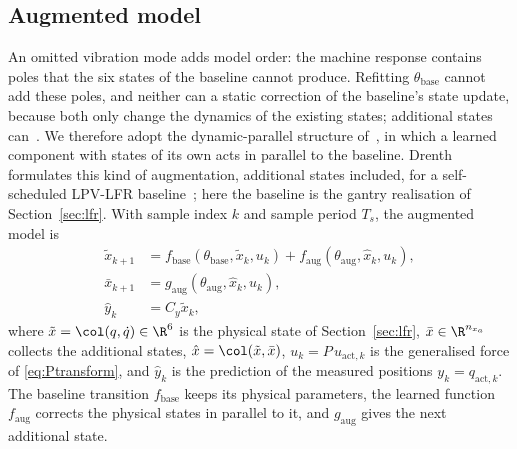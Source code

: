 \subsection{Augmented model}\label{sec:aug_structure}
An omitted vibration mode adds model order: the machine response contains
poles that the six states of the baseline cannot produce.
Refitting $\theta_{\mathrm{base}}$ cannot add these poles, and neither can a
static correction of the baseline's state update, because both only change
the dynamics of the existing states; additional states
can~\cite[Sec.~2]{hoekstra2025lfr}.
We therefore adopt the dynamic-parallel structure
of~\cite[Table~1]{hoekstra2026lfr}, in which a learned component with states
of its own acts in parallel to the baseline.
Drenth formulates this kind of augmentation, additional states included, for
a self-scheduled LPV-LFR baseline~\cite[Sec.~5.2]{drenth2025thesis}; here the
baseline is the gantry realisation of Section~\ref{sec:lfr}.
With sample index $k$ and sample period $T_s$, the augmented model is
\begin{equation}
\begin{aligned}
 \tilde x_{k+1}
 &=f_{\mathrm{base}}(\theta_{\mathrm{base}},\tilde x_k,u_k)
   +f_{\mathrm{aug}}(\theta_{\mathrm{aug}},\hat x_k,u_k),\\
 \bar x_{k+1}
 &=g_{\mathrm{aug}}(\theta_{\mathrm{aug}},\hat x_k,u_k),\\
 \hat y_k&=C_y\tilde x_k ,
\end{aligned}
\label{eq:aug_transition}
\end{equation}
where $\tilde x=\col(q,\dot q)\in\R^6$ is the physical state of
Section~\ref{sec:lfr}, $\bar x\in\R^{n_{x_a}}$ collects the additional
states, $\hat x=\col(\tilde x,\bar x)$, $u_k=P\,u_{\mathrm{act},k}$ is the
generalised force of \eqref{eq:Ptransform}, and $\hat y_k$ is the prediction
of the measured positions $y_k=q_{\mathrm{act},k}$.
The baseline transition $f_{\mathrm{base}}$ keeps its physical parameters,
the learned function $f_{\mathrm{aug}}$ corrects the physical states in
parallel to it, and $g_{\mathrm{aug}}$ gives the next additional state.

